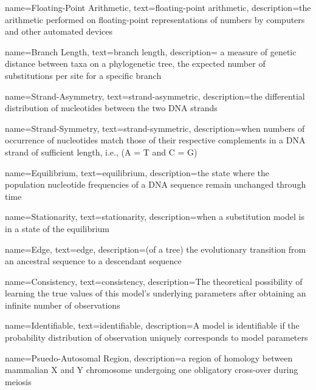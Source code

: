 \makeglossaries

{
        name=Floating-Point Arithmetic,
        text=floating-point arithmetic,
        description={the arithmetic performed on floating-point representations of numbers by computers and other automated devices}
}


{
        name=Branch Length,
        text=branch length,
        description={ a measure of genetic distance between taxa on a phylogenetic tree, the expected number of substitutions per site for a specific branch}
}


{
        name=Strand-Asymmetry,
        text={strand-asymmetric},
        description={the differential distribution of nucleotides between the two DNA strands}
}

{
        name=Strand-Symmetry,
        text=strand-symmetric,
        description={when numbers of occurrence of nucleotides match those of their respective complements in a DNA strand of sufficient length, i.e., (A = T and C = G)}
}


{
        name=Equilibrium,
        text=equilibrium,
        description={the state where the population nucleotide frequencies of a DNA sequence remain unchanged through time}
}

{
        name=Stationarity,
        text=stationarity,
        description={when a substitution model is in a state of the \gls{equilibrium}}
}


{
        name=Edge,
        text=edge,
        description={(of a tree) the evolutionary transition from an ancestral sequence to a descendant sequence}
}

{
        name=Consistency,
        text=consistency,
        description={The theoretical possibility of learning the true values of this model's underlying parameters after obtaining an infinite number of observations}
}

{
        name=Identifiable,
        text=identifiable,
        description={A model is identifiable if the probability distribution of observation uniquely corresponds to model parameters}
}


{
        name=Psuedo-Autosomal Region,
        description={a region of homology between mammalian X and Y chromosome undergoing one obligatory cross-over during meiosis}
}

